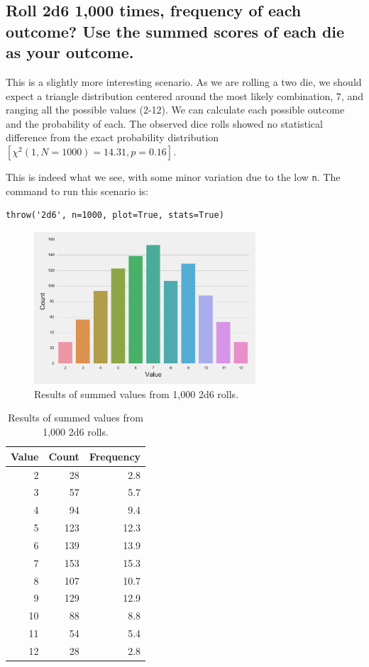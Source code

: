 \documentclass[twocolumn,letterpaper]{article}  %
\begin{document}
\subsection{Roll 2d6 1,000 times, frequency of each outcome? Use the summed scores of each die as your outcome.}
This is a slightly more interesting scenario. As we are rolling a two die, we should expect a triangle distribution centered around the most likely combination, 7, and ranging all the possible values (2-12). We can calculate each possible outcome and the probability of each. The observed dice rolls showed no statistical difference from the exact probability distribution $[\chi^2 (1,N=1000)=14.31, p=0.16]$.

This is indeed what we see, with some minor variation due to the low \texttt{n}. The command to run this scenario is:

\begin{lstlisting}
throw('2d6', n=1000, plot=True, stats=True)
\end{lstlisting}

\begin{figure}[h!]
\centering
\includegraphics[width=3.25in]{2d6.pdf}
\caption{Results of summed values from 1,000 2d6 rolls.}
\end{figure}

\begin{table}[h!]
\begin{center}
\begin{tabular}{*{3}{r}}
\toprule
Value & Count & Frequency \\
\midrule
     2 &    28 &       2.8 \\
     3 &    57 &       5.7 \\
     4 &    94 &       9.4 \\
     5 &   123 &      12.3 \\
     6 &   139 &      13.9 \\
     7 &   153 &      15.3 \\
     8 &   107 &      10.7 \\
     9 &   129 &      12.9 \\
    10 &    88 &       8.8 \\
    11 &    54 &       5.4 \\
    12 &    28 &       2.8 \\
\bottomrule
\end{tabular}
\end{center}
\caption{Results of summed values from 1,000 2d6 rolls.}
\end{table}
\end{document}
